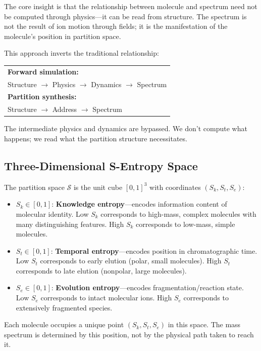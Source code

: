 \documentclass[twocolumn,10pt]{article}
\begin{document}
The core insight is that the relationship between molecule and spectrum need not be computed through physics---it can be read from structure. The spectrum is not the result of ion motion through fields; it is the manifestation of the molecule's position in partition space.

This approach inverts the traditional relationship:

\begin{center}
\begin{tabular}{l}
\textbf{Forward simulation:} \\
Structure $\to$ Physics $\to$ Dynamics $\to$ Spectrum \\[1ex]
\textbf{Partition synthesis:} \\
Structure $\to$ Address $\to$ Spectrum
\end{tabular}
\end{center}

The intermediate physics and dynamics are bypassed. We don't compute what happens; we read what the partition structure necessitates.

\subsection{Three-Dimensional S-Entropy Space}

The partition space $\mathcal{S}$ is the unit cube $[0,1]^3$ with coordinates $(S_k, S_t, S_e)$:

\begin{itemize}[leftmargin=*]
\item $S_k \in [0,1]$: \textbf{Knowledge entropy}---encodes information content of molecular identity. Low $S_k$ corresponds to high-mass, complex molecules with many distinguishing features. High $S_k$ corresponds to low-mass, simple molecules.

\item $S_t \in [0,1]$: \textbf{Temporal entropy}---encodes position in chromatographic time. Low $S_t$ corresponds to early elution (polar, small molecules). High $S_t$ corresponds to late elution (nonpolar, large molecules).

\item $S_e \in [0,1]$: \textbf{Evolution entropy}---encodes fragmentation/reaction state. Low $S_e$ corresponds to intact molecular ions. High $S_e$ corresponds to extensively fragmented species.
\end{itemize}

Each molecule occupies a unique point $(S_k, S_t, S_e)$ in this space. The mass spectrum is determined by this position, not by the physical path taken to reach it.
\end{document}
